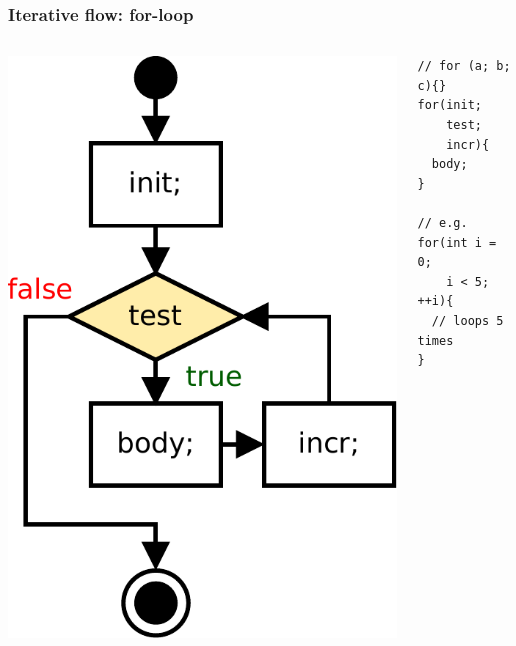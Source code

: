 \begin{frame}[fragile]
\frametitle{Iterative flow: for-loop}
\begin{columns}[c]
  \begin{column}{0.5\textwidth}
  \hfill
\includegraphics[scale=0.5]{figures/flow-for}
  \end{column}
  \begin{column}{0.5\textwidth}
\begin{lstlisting}
// for (a; b; c){}
for(init;
    test;
    incr){
  body;
}

// e.g.
for(int i = 0;
    i < 5; ++i){
  // loops 5 times
}
\end{lstlisting}
  \end{column}
\end{columns}
\end{frame}

